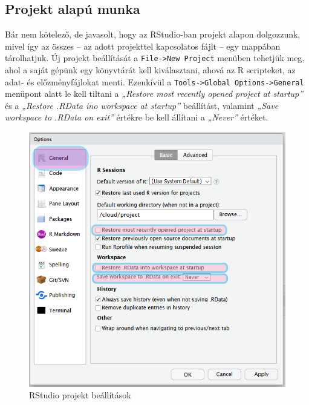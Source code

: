 \documentclass[
]{book}
\begin{document}
\hypertarget{projektmunka}{%
\subsection{Projekt alapú munka}\label{projektmunka}}

Bár nem kötelező, de javasolt, hogy az RStudio-ban projekt alapon
dolgozzunk, mivel így az összes -- az adott projekttel kapcsolatos fájlt
-- egy mappában tárolhatjuk. Új projekt beállítását a
\texttt{File-\textgreater{}New\ Project} menüben tehetjük meg, ahol a
saját gépünk egy könyvtárát kell kiválasztani, ahová az R scripteket, az
adat- és előzményfájlokat menti. Ezenkívül a
\texttt{Tools-\textgreater{}Global\ Options-\textgreater{}General}
menüpont alatt le kell tiltani a \emph{„Restore most recently opened
project at startup''} és a \emph{„Restore .RData ino workspace at
startup''} beállítást, valamint \emph{„Save workspace to .RData on
exit''} értékre be kell állítani a \emph{„Never''} értéket.

\begin{figure}

{\centering \includegraphics{figures/13-02_project_options} 

}

\caption{RStudio projekt beállítások}\label{fig:unnamed-chunk-18}
\end{figure}
\end{document}

